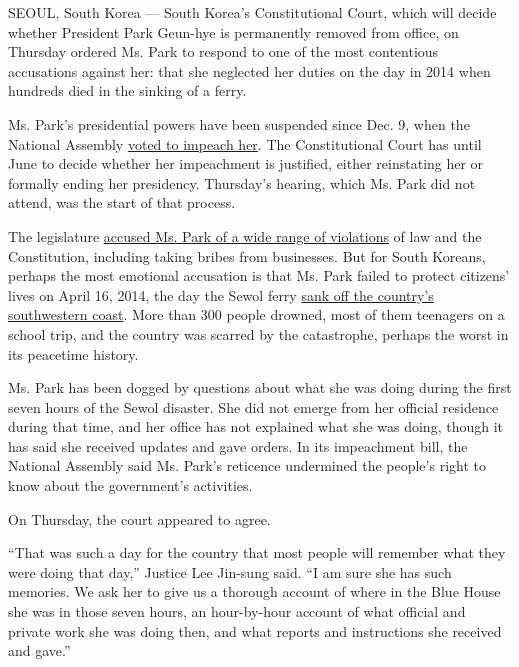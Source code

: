 SEOUL, South Korea --- South Korea's Constitutional Court, which will
decide whether President Park Geun-hye is permanently removed from
office, on Thursday ordered Ms. Park to respond to one of the most
contentious accusations against her: that she neglected her duties on
the day in 2014 when hundreds died in the sinking of a ferry.

Ms. Park's presidential powers have been suspended since Dec. 9, when
the National Assembly
\href{http://www.nytimes3xbfgragh.onion/2016/12/09/world/asia/south-korea-president-park-geun-hye-impeached.html}{voted
to impeach her}. The Constitutional Court has until June to decide
whether her impeachment is justified, either reinstating her or formally
ending her presidency. Thursday's hearing, which Ms. Park did not
attend, was the start of that process.

The legislature
\href{http://www.nytimes3xbfgragh.onion/2016/12/08/world/asia/south-korea-park-geun-hye-accusations-impeachment.html}{accused
Ms. Park of a wide range of violations} of law and the Constitution,
including taking bribes from businesses. But for South Koreans, perhaps
the most emotional accusation is that Ms. Park failed to protect
citizens' lives on April 16, 2014, the day the Sewol ferry
\href{https://www.nytimes3xbfgragh.onion/2014/04/21/world/asia/chaos-ruled-sinking-ferry.html}{sank
off the country's southwestern coast}. More than 300 people drowned,
most of them teenagers on a school trip, and the country was scarred by
the catastrophe, perhaps the worst in its peacetime history.

Ms. Park has been dogged by questions about what she was doing during
the first seven hours of the Sewol disaster. She did not emerge from her
official residence during that time, and her office has not explained
what she was doing, though it has said she received updates and gave
orders. In its impeachment bill, the National Assembly said Ms. Park's
reticence undermined the people's right to know about the government's
activities.

On Thursday, the court appeared to agree.

``That was such a day for the country that most people will remember
what they were doing that day,'' Justice Lee Jin-sung said. ``I am sure
she has such memories. We ask her to give us a thorough account of where
in the Blue House she was in those seven hours, an hour-by-hour account
of what official and private work she was doing then, and what reports
and instructions she received and gave.''


